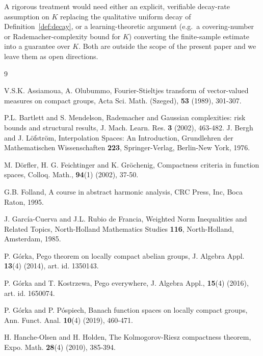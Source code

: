 \documentclass[11pt]{amsart}
\begin{document}
\noindent A rigorous treatment
would need either  an explicit, verifiable decay-rate assumption on $K$
replacing the qualitative uniform decay of Definition~\ref{def:decay}, or  a
learning-theoretic argument (e.g.\ a covering-number or Rademacher-complexity
bound for $K$\cite{bartlett2002})  converting the finite-sample estimate  into a
guarantee over $K$. Both are outside the scope of the present paper and we
leave them as open directions.






\begin{thebibliography}{9}

 V.S.K. Assiamoua, A. Olubummo, Fourier-Stieltjes transform of vector-valued measures on compact groups, Acta Sci. Math. (Szeged), {\bf 53} (1989), 301-307.

 P.L. Bartlett and S. Mendelson, Rademacher and Gaussian complexities: risk bounds and
structural results, J. Mach. Learn. Res. {\bf 3} (2002), 463-482.
J. Bergh and J. L\"ofstr\"om, Interpolation Spaces: An Introduction,
Grundlehren der Mathematischen Wissenschaften \textbf{223}, Springer-Verlag, Berlin-New York, 1976.

 M. D\"orfler, H. G. Feichtinger and K. Gr\"ochenig, Compactness criteria in function spaces,
Colloq. Math., {\bf 94}(1) (2002), 37-50.

 G.B. Folland, A course in abstract harmonic analysis,  CRC Press, Inc, Boca Raton, 1995. 


J. Garc\'ia-Cuerva and J.L. Rubio de Francia, Weighted Norm Inequalities and
Related Topics, North-Holland Mathematics Studies \textbf{116}, North-Holland,
Amsterdam, 1985.

 P. G\'orka, Pego theorem on locally compact abelian groups, J. Algebra Appl. \textbf{13}(4) (2014), art. id. 1350143.


 P. G\'orka and T. Kostrzewa, Pego everywhere, J. Algebra Appl., {\bf 15}(4) (2016), art. id. 1650074.

 P.  G\'orka and P. P\'ospiech, Banach function spaces on locally compact groups, Ann. Funct.
Anal. {\bf 10}(4) (2019), 460-471.



 H. Hanche-Olsen and H. Holden, The Kolmogorov-Riesz compactness theorem, Expo. Math.
{\bf 28}(4) (2010), 385-394.


\end{thebibliography}
\end{document}
